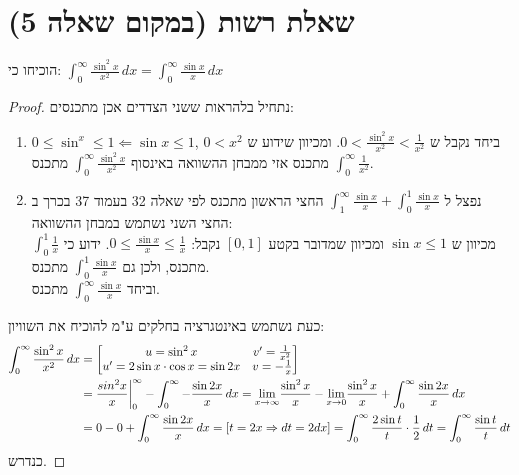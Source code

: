 \documentclass{article}
\begin{document}
	\section*{שאלת רשות (במקום שאלה 5)}
	הוכיחו כי:
	$\int_0^\infty \frac{\sin^2 x}{x^2} \, dx = \int_0^\infty \frac{\sin x}{x} \, dx$
	\begin{proof}
		נתחיל בלהראות ששני הצדדים אכן מתכנסים:
		\begin{enumerate}
			\item $0 \leq \sin^ x \leq 1 \Leftarrow \sin x \leq 1$,  $0 < x^2$
			ביחד נקבל ש $0 < \frac{\sin^2 x}{x^2} < \frac{1}{x^2}$.
			ומכיוון שידוע ש $\int_0^\infty \frac{1}{x^2}$ מתכנס אזי ממבחן ההשוואה באינסוף $\int_0^\infty \frac{\sin^2 x}{x^2}$ מתכנס.

			\item נפצל ל $\int_1^\infty \frac{\sin x}{x} + \int_0^1 \frac{\sin x}{x}$ החצי הראשון מתכנס לפי שאלה 32 בעמוד 37 בכרך ב
			החצי השני נשתמש במבחן ההשוואה: \\
			מכיוון ש $\sin x \leq 1$ ומכיוון שמדובר בקטע $[0,1]$ נקבל: $0 \leq \frac{\sin x}{x} \leq \frac{1}{x}$.
			ידוע כי $\int_0^1 \frac{1}{x}$ מתכנס, ולכן גם $\int_0^1 \frac{\sin x}{x}$ מתכנס. \\
			וביחד $\int_0^\infty \frac{\sin x}{x}$ מתכנס.
		\end{enumerate}
		כעת נשתמש באינטגרציה בחלקים ע"מ להוכיח את השוויון:
		\begin{align*}
			\int_0^\infty \frac{\sin^2 x}{x^2} \, dx &= \begin{bmatrix}
				u = \sin^2 x & v' = \frac{1}{x^2} \\
				u' = 2\sin x \cdot \cos x = \sin 2x & v = - \frac{1}{x}
			\end{bmatrix} \\
			&= \frac{sin^2 x}{x} \biggr|_0^\infty - \int_0^\infty - \frac{\sin 2x}{x} \, dx =
			\displaystyle{\lim_{x \to \infty}} \frac{\sin^2 x}{x} - \displaystyle{\lim_{x \to 0}} \frac{\sin^2 x}{x} + \int_0^\infty \frac{\sin 2x}{x} \, dx \\
			&= 0 - 0 + \int_0^\infty \frac{\sin 2x}{x} \, dx = [t = 2x \Rightarrow dt = 2dx] =
			\int_0^\infty \frac{2 \sin t}{t} \cdot \frac{1}{2} \, dt = \int_0^\infty \frac{\sin t}{t} \, dt
		\end{align*}
		כנדרש.
	\end{proof}
\end{document}
